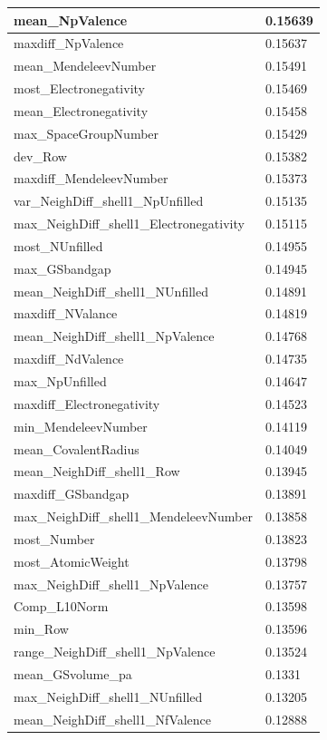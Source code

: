 \begin{longtable}{|l|l|}
mean\_NpValence & 0.15639 \\ \hline
maxdiff\_NpValence & 0.15637 \\ \hline
mean\_MendeleevNumber & 0.15491 \\ \hline
most\_Electronegativity & 0.15469 \\ \hline
mean\_Electronegativity & 0.15458 \\ \hline
max\_SpaceGroupNumber & 0.15429 \\ \hline
dev\_Row & 0.15382 \\ \hline
maxdiff\_MendeleevNumber & 0.15373 \\ \hline
var\_NeighDiff\_shell1\_NpUnfilled & 0.15135 \\ \hline
max\_NeighDiff\_shell1\_Electronegativity & 0.15115 \\ \hline
most\_NUnfilled & 0.14955 \\ \hline
max\_GSbandgap & 0.14945 \\ \hline
mean\_NeighDiff\_shell1\_NUnfilled & 0.14891 \\ \hline
maxdiff\_NValance & 0.14819 \\ \hline
mean\_NeighDiff\_shell1\_NpValence & 0.14768 \\ \hline
maxdiff\_NdValence & 0.14735 \\ \hline
max\_NpUnfilled & 0.14647 \\ \hline
maxdiff\_Electronegativity & 0.14523 \\ \hline
min\_MendeleevNumber & 0.14119 \\ \hline
mean\_CovalentRadius & 0.14049 \\ \hline
mean\_NeighDiff\_shell1\_Row & 0.13945 \\ \hline
maxdiff\_GSbandgap & 0.13891 \\ \hline
max\_NeighDiff\_shell1\_MendeleevNumber & 0.13858 \\ \hline
most\_Number & 0.13823 \\ \hline
most\_AtomicWeight & 0.13798 \\ \hline
max\_NeighDiff\_shell1\_NpValence & 0.13757 \\ \hline
Comp\_L10Norm & 0.13598 \\ \hline
min\_Row & 0.13596 \\ \hline
range\_NeighDiff\_shell1\_NpValence & 0.13524 \\ \hline
mean\_GSvolume\_pa & 0.1331 \\ \hline
max\_NeighDiff\_shell1\_NUnfilled & 0.13205 \\ \hline
mean\_NeighDiff\_shell1\_NfValence & 0.12888 \\ \hline

\end{longtable}
